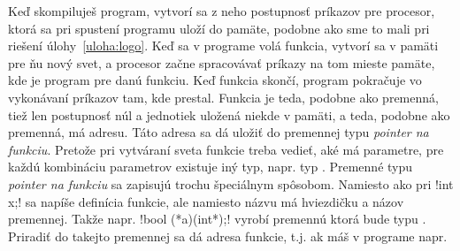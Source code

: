  Keď skompiluješ program, vytvorí sa z neho postupnosť príkazov pre procesor,
ktorá sa pri spustení programu uloží do pamäte, podobne ako sme to mali pri riešení
úlohy~\ref{uloha:logo}. Keď sa v programe volá funkcia, vytvorí sa v pamäti
pre ňu nový svet, a procesor začne spracovávať príkazy na tom mieste pamäte,
kde je program pre danú funkciu. Keď funkcia skončí, program pokračuje vo vykonávaní
príkazov tam, kde prestal. Funkcia je teda, podobne ako premenná, tiež len postupnosť
núl a jednotiek uložená niekde v pamäti, a teda, podobne ako premenná, má adresu.
Táto adresa sa dá uložiť do premennej typu {\em pointer na funkciu}. Pretože pri vytváraní
sveta funkcie treba vedieť, aké má parametre, pre každú kombináciu parametrov existuje
iný typ, napr. typ . Premenné typu {\em pointer na funkciu} sa zapisujú trochu špeciálnym 
spôsobom. Namiesto  ako pri \prg!int x;! sa napíše definícia funkcie,
ale namiesto názvu má hviezdičku a názov premennej. Takže napr. 
\prg!bool (*a)(int*);! vyrobí premennú  ktorá bude typu . Priradiť do takejto premennej sa dá
adresa funkcie, t.j. ak máš v programe napr. 
